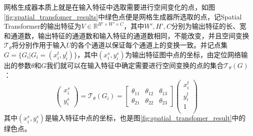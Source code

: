 网格生成器本质上就是在输入特征中选取需要进行空间变化的点，如图\ref{fig:spatial_transfomer_results}中绿色点便是网格生成器所选取的点，记Spatial Transformer的输出特征为$V\in \mathbb{R}^{H'\times W'\times C}$，其中$W',H',C$分别为输出特征的长、宽和通道数，输出特征的通道数和输入特征的通道数相同，不能改变，并且空间变换$\mathcal{T}_{\theta}$将分别作用于输入$U$的各个通道以保证每个通道上的变换一致。并记点集$G = \{G_i|G_i = (x^t_i, y^t_i)\}$，其中$(x_i^s, y_i^s)$为输出特征图中点的坐标，由定位网络输出的参数$\theta$和$G$我们就可以在输入特征中确定需要进行空间变换的点的集合$\mathcal{T}_\theta(G)$：
\begin{equation}
  \left(
    \begin{array}{c}
      x_i^s\\
      y_i^s
    \end{array}
  \right) = \mathcal{T}_\theta(G_i) =
  \left[
    \begin{array}{ccc}
    \theta_{11}&\theta_{12}&\theta_{13}\\
    \theta_{21}&\theta_{22}&\theta_{23}
    \end{array}
  \right]
  \left(
    \begin{array}{c}
      x_i^t\\
      y_i^t\\
      1\\
    \end{array}
  \right)
\end{equation}
其中$(x_i^s, y_i^s)$是输入特征中点的坐标，也是图\ref{fig:spatial_transfomer_result}中的绿色点。

